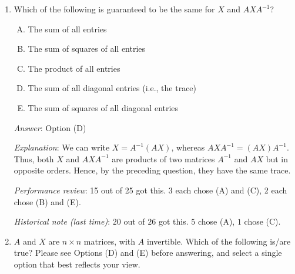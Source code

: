 \documentclass[10pt]{amsart}
\begin{document}
\begin{enumerate}
  {\em Historical note (last time)}: $23$ out of $26$ got this. $1$ each chose
  (B), (C), and (D).

  \vspace{0.5in}

  Suppose $A$ is an invertible $n \times n$ matrix. The {\em
    conjugation operation} corresponding to $A$ is the map that sends
  any $n \times n$ matrix $X$ to $AXA^{-1}$. We can verify that the
  following hold for any two (possibly equal, possibly distinct) $n
  \times n$ matrices $X$ and $Y$:

  \begin{eqnarray*}
    A(X + Y)A^{-1} & = &  AXA^{-1} + AYA^{-1}\\
    A(XY)A^{-1} & = & (AXA^{-1})(AYA^{-1})\\
    AX^rA^{-1} & = & (AXA^{-1})^r\\
  \end{eqnarray*}

  The conceptual significance of this will (hopefully!) become clearer
  as we proceed. 

\item Which of the following is guaranteed to be the same for $X$ and
  $AXA^{-1}$?

  \begin{enumerate}[(A)]
  \item The sum of all entries
  \item The sum of squares of all entries
  \item The product of all entries
  \item The sum of all diagonal entries (i.e., the trace)
  \item The sum of squares of all diagonal entries
  \end{enumerate}

  {\em Answer}: Option (D)

  {\em Explanation}: We can write $X = A^{-1}(AX)$, whereas $AXA^{-1}
  = (AX)A^{-1}$. Thus, both $X$ and $AXA^{-1}$ are products of two
  matrices $A^{-1}$ and $AX$ but in opposite orders. Hence, by the
  preceding question, they have the same trace.

  {\em Performance review}: 15 out of 25 got this. 3 each chose (A)
  and (C), 2 each chose (B) and (E).

  {\em Historical note (last time)}: $20$ out of $26$ got this. $5$ chose (A),
  $1$ chose (C).

\item $A$ and $X$ are $n \times n$ matrices, with $A$
  invertible. Which of the following is/are true? Please see Options
  (D) and (E) before answering, and select a single option that best
  reflects your view.


\end{enumerate}
\end{document}
